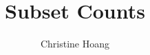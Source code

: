\documentclass{article}
\title{Subset Counts}
\author{Christine Hoang}
\begin{document}
\maketitle

\section{}
\end{document}
